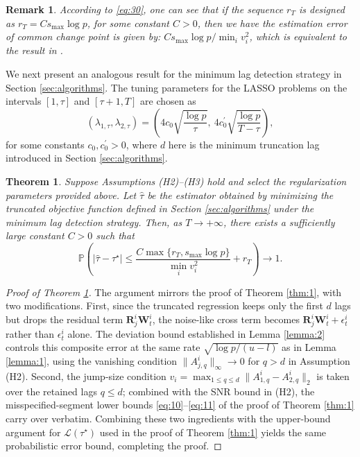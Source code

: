 \documentclass[11pt]{article}
\newtheorem{theorem}{Theorem}
\newtheorem{remark}{Remark}
\begin{document}
\begin{remark}
\label{remark:1}
According to \eqref{eq:30}, one can see that if the sequence $r_T$ is designed as $r_T = Cs_{\max}\log p$, for some constant $C>0$, then we have the estimation error of common change point is given by: $Cs_{\max}\log p / \min_i v_i^2$, which is equivalent to the result in \cite{wang2019localizing}.
\end{remark}

We next present an analogous result for the minimum lag detection strategy in Section \ref{sec:algorithms}. The tuning parameters for the LASSO problems on the intervals $[1,\tau]$ and $[\tau+1,T]$ are chosen as
\begin{equation*}
    (\lambda_{1,\tau}, \lambda_{2,\tau}) = \left( 4c_0\sqrt{\frac{\log p}{\tau}},\ 4c_0^\prime\sqrt{\frac{\log p}{T-\tau}} \right),
\end{equation*}
for some constants $c_0, c_0^\prime>0$, where $d$ here is the minimum truncation lag introduced in Section \ref{sec:algorithms}.
\begin{theorem}
\label{thm:1b}
Suppose Assumptions (H2)--(H3) hold and select the regularization parameters provided above. Let $\widehat{\tau}$ be the estimator obtained by minimizing the truncated objective function defined in Section \ref{sec:algorithms} under the minimum lag detection strategy. Then, as $T\to +\infty$, there exists a sufficiently large constant $C>0$ such that
\begin{equation*}
    \mathbb{P}\left( |\widehat{\tau} - \tau^\star| \leq \frac{C\max\{r_T, s_{\max}\log p\}}{\min_i v_i^2} + r_T \right) \to 1.
\end{equation*}
\end{theorem}

\begin{proof}[Proof of Theorem \ref{thm:1b}]
The argument mirrors the proof of Theorem \ref{thm:1}, with two modifications. First, since the truncated regression keeps only the first $d$ lags but drops the residual term $\mathbf{R}_j^i \mathbf{W}_t^i$, the noise-like cross term becomes $\mathbf{R}_j^i \mathbf{W}_t^i + \epsilon_t^i$ rather than $\epsilon_t^i$ alone. The deviation bound established in Lemma \ref{lemma:2} controls this composite error at the same rate $\sqrt{\log p/(u-l)}$ as in Lemma \ref{lemma:1}, using the vanishing condition $\|A_{j,q}^i\|_\infty \to 0$ for $q > d$ in Assumption (H2). Second, the jump-size condition $v_i = \max_{1\leq q \leq d}\|A_{1,q}^i - A_{2,q}^i\|_2$ is taken over the retained lags $q \leq d$; combined with the SNR bound in (H2), the misspecified-segment lower bounds \eqref{eq:10}--\eqref{eq:11} of the proof of Theorem \ref{thm:1} carry over verbatim. Combining these two ingredients with the upper-bound argument for $\mathcal{L}(\tau^\star)$ used in the proof of Theorem \ref{thm:1} yields the same probabilistic error bound, completing the proof.
\end{proof}
\end{document}
